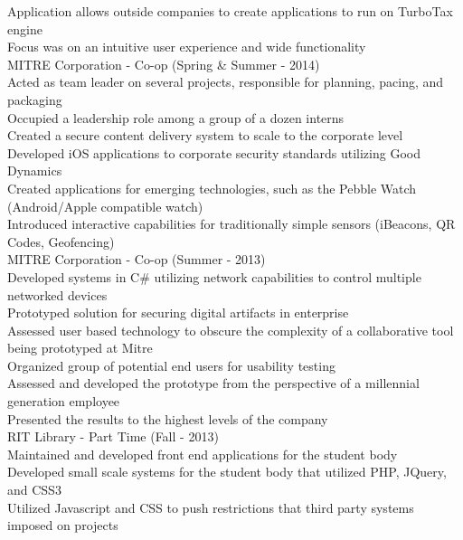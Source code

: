 \documentclass{article}
\begin{document}
Application allows outside companies to create applications to run on TurboTax engine \\
Focus was on an intuitive user experience and wide functionality \\
{\large MITRE Corporation - Co-op (Spring \& Summer - 2014) } \\
Acted as team leader on several projects, responsible for planning, pacing, and packaging \\
Occupied a leadership role among a group of a dozen interns \\
Created a secure content delivery system to scale to the corporate level \\
Developed iOS applications to corporate security standards utilizing Good Dynamics \\
Created applications for emerging technologies, such as the Pebble Watch (Android/Apple compatible watch) \\
Introduced interactive capabilities for traditionally simple sensors (iBeacons, QR Codes, Geofencing) \\
{\large MITRE Corporation - Co-op (Summer - 2013) } \\
Developed systems in C\# utilizing network capabilities to control multiple networked devices \\
Prototyped solution for securing digital artifacts in enterprise \\
Assessed user based technology to obscure the complexity of a collaborative tool being prototyped at Mitre \\
Organized group of potential end users for usability testing \\
Assessed and developed the prototype from the perspective of a millennial generation employee \\
Presented the results to the highest levels of the company \\
{\large RIT Library - Part Time (Fall - 2013) } \\
Maintained and developed front end applications for the student body \\
Developed small scale systems for the student body that utilized PHP, JQuery, and CSS3 \\
Utilized Javascript and CSS to push restrictions that third party systems imposed on projects \\
\end{document}
